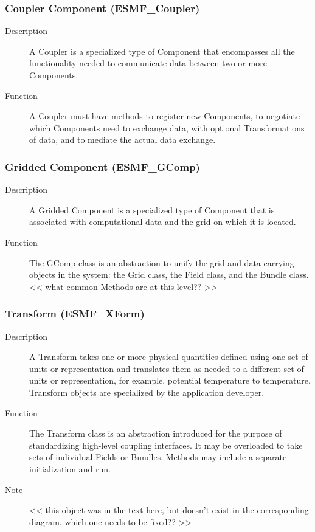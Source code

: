 \subsubsection{Coupler Component (ESMF\_Coupler)}
\begin{description}
\item [Description] A Coupler is a specialized type of Component that encompasses all the 
functionality needed to communicate data between two or more Components. 
\item [Function] A Coupler must have methods to register new Components, to negotiate
which Components need to exchange data, with optional Transformations of data, and to
mediate the actual data exchange.
\end{description}

\subsubsection{Gridded Component (ESMF\_GComp)}
\label{sec:griddedcomponent} 
\begin{description}
\item [Description] A Gridded Component is a specialized type of Component that is associated
with computational data and the grid on which it is located.
\item [Function] The GComp class is an abstraction to unify the grid and data carrying
objects in the system: the Grid class, the Field class, and the Bundle class.
<< what common Methods are at this level?? >>
\end{description}

\subsubsection{Transform (ESMF\_XForm)} 
\begin{description}
\item [Description] A Transform takes one or more physical quantities defined using one set 
of units or representation and translates them as needed to a different set of units or 
representation, for example, potential temperature to temperature.  Transform objects 
are specialized by the application developer.
\item [Function] The Transform class is an abstraction introduced for the
purpose of standardizing high-level coupling interfaces.  It may be overloaded
to take sets of individual Fields or Bundles.  Methods may include a
separate initialization and run. 
\item [Note] << this object was in the text here, but doesn't
exist in the corresponding diagram.  which one needs to be fixed?? >>
\end{description}






